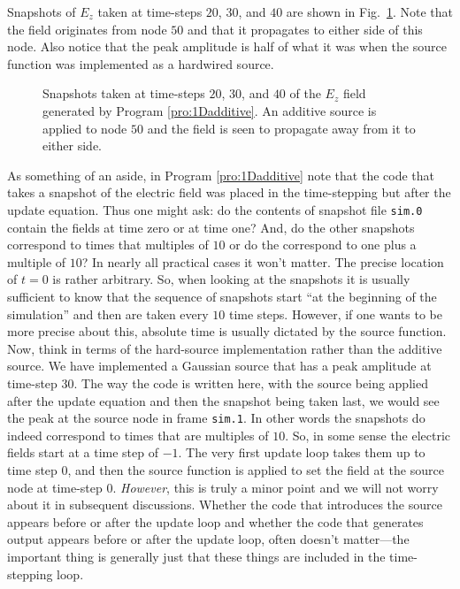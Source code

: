 Snapshots of $E_z$ taken at time-steps $20$, $30$, and $40$ are shown
in Fig.\ \ref{fig:additive}.  Note that the field originates from node
$50$ and that it propagates to either side of this node.  Also notice
that the peak amplitude is half of what it was when the source
function was implemented as a hardwired source.
\begin{figure}
  \begin{center}
  \end{center}
  \caption{Snapshots taken at time-steps $20$, $30$, and $40$ of the
    $E_z$ field generated by Program \ref{pro:1Dadditive}.  An
    additive source is applied to node $50$ and the field is seen to
    propagate away from it to either side.}
  \label{fig:additive} 
\end{figure}

As something of an aside, in Program \ref{pro:1Dadditive} note that
the code that takes a snapshot of the electric field was placed in the
time-stepping but after the update equation.  Thus one might ask: do
the contents of snapshot file {\tt sim.0} contain the fields at time
zero or at time one?  And, do the other snapshots correspond to times
that multiples of $10$ or do the correspond to one plus a multiple of
$10$?  In nearly all practical cases it won't matter.  The precise
location of $t=0$ is rather arbitrary.  So, when looking at the
snapshots it is usually sufficient to know that the sequence of
snapshots start ``at the beginning of the simulation'' and then are
taken every $10$ time steps.  However, if one wants to be more precise
about this, absolute time is usually dictated by the source function.
Now, think in terms of the hard-source implementation rather than the
additive source.  We have implemented a Gaussian source that has a
peak amplitude at time-step $30$.  The way the code is written here,
with the source being applied after the update equation and then the
snapshot being taken last, we would see the peak at the source node in
frame {\tt sim.1}.  In other words the snapshots do indeed correspond
to times that are multiples of $10$.  So, in some sense the electric
fields start at a time step of $-1$.  The very first update
loop takes them up to time step $0$, and then the source function is
applied to set the field at the source node at time-step $0$.  {\em
  However}, this is truly a minor point and we will not worry about it
in subsequent discussions.  Whether the code that introduces the
source appears before or after the update loop and whether the code
that generates output appears before or after the update loop, often
doesn't matter---the important thing is generally just that these
things are included in the time-stepping loop.

